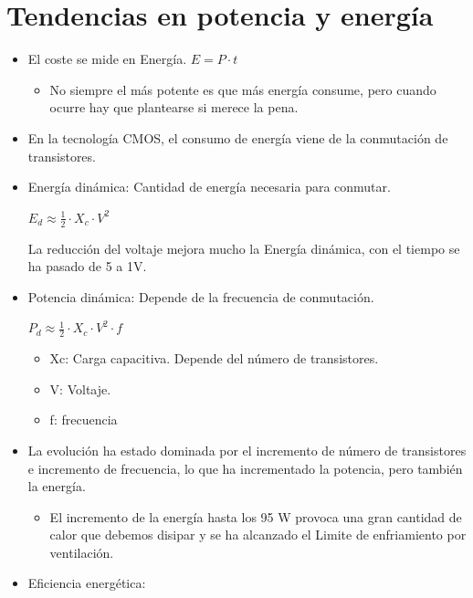 \documentclass[12pt, twoside, openright]{report} %
\begin{document}
  \section{Tendencias en potencia y energía}

  \begin{itemize}
  
  \item
    El coste se mide en Energía. \(E= P \cdot t\)

    \begin{itemize}
    
    \item
      No siempre el más potente es que más energía consume, pero cuando
      ocurre hay que plantearse si merece la pena.
    \end{itemize}
  \item
    En la tecnología CMOS, el consumo de energía viene de la conmutación
    de transistores.
  \item
    Energía dinámica: Cantidad de energía necesaria para conmutar.

    
    
      \(E_d \approx \frac 1 2 \cdot X_c\cdot V^2\)

      La reducción del voltaje mejora mucho la Energía dinámica, con el
      tiempo se ha pasado de 5 a 1V.

    \item
    Potencia dinámica: Depende de la frecuencia de conmutación.

    
    
      \(P_d \approx \frac 1 2 \cdot X_c\cdot V^2\cdot f\)

    \begin{itemize}
      
      \item
        Xc: Carga capacitiva. Depende del número de transistores.
      \item
        V: Voltaje.
      \item
        f: frecuencia
      \end{itemize}
      \pagebreak
    \item
    La evolución ha estado dominada por el incremento de número de
    transistores e incremento de frecuencia, lo que ha incrementado la
    potencia, pero también la energía.

    \begin{itemize}
    
    \item
      El incremento de la energía hasta los 95 W provoca una gran
      cantidad de calor que debemos disipar y se ha alcanzado el Limite
      de enfriamiento por ventilación.
    \end{itemize}
  \item
    Eficiencia energética:


\end{itemize}
\end{document}
